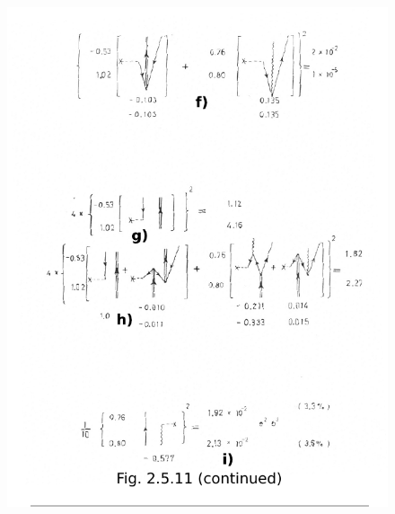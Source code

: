          \begin{figure}
              \centerline {
              \includegraphics*[width=12cm]{introduccion/figs/fig24b}
              }
              \end{figure}
